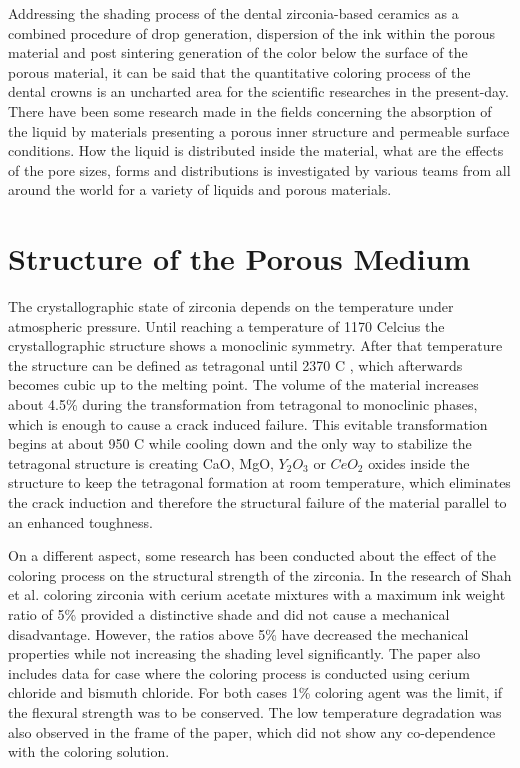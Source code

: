 Addressing the shading process of the dental zirconia-based ceramics as a combined procedure of drop generation, dispersion of the ink within the porous material and post sintering generation of the color below the surface of the porous material, it can be said that the quantitative coloring process of the dental crowns is an uncharted area for the scientific researches in the present-day. There have been some research made in the fields concerning the absorption of the liquid by materials presenting a porous inner structure and permeable surface conditions. How the liquid is distributed inside the material, what are the effects of the pore sizes, forms and distributions is investigated by various teams from all around the world for a variety of liquids and porous materials. 



\section{Structure of the Porous Medium}

The crystallographic state of zirconia depends on the temperature under atmospheric pressure. Until reaching a temperature of {1170\textdegree} Celcius the crystallographic structure shows a monoclinic symmetry. After that temperature the structure can be defined as tetragonal until {2370\textdegree} C , which afterwards becomes cubic up to the melting point. The volume of the material increases about 4.5\% during the transformation from tetragonal to monoclinic phases, which is enough to cause a crack induced failure. This evitable transformation begins at about {950\textdegree} C while cooling down and the only way to stabilize the tetragonal structure is creating CaO, MgO, $Y_{2}O_{3}$ or $CeO_{2}$ oxides inside the structure to keep the tetragonal formation  at room temperature, which eliminates the crack induction and therefore the structural failure of the material parallel to an enhanced toughness. \citep{denry2008state}

On a different aspect, some research has been conducted about the effect of the coloring process on the structural strength of the zirconia. In the research of Shah et al. coloring zirconia with cerium acetate mixtures with a maximum ink weight ratio of 5\% provided a distinctive shade and did not cause a mechanical disadvantage. However, the ratios above 5\% have decreased the mechanical properties while not increasing the shading level significantly. The paper also includes data for case where the coloring process is conducted using cerium chloride and bismuth chloride. For both cases 1\% coloring agent was the limit, if the flexural strength was to be conserved. The low temperature degradation was also observed in the frame of the paper, which did not show any co-dependence with the coloring solution.\citep{shah2008effect}

